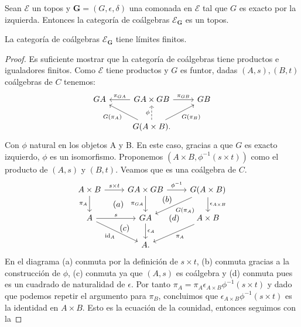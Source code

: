 \begin{theorem}[label=thm:toposcoalg]
  Sean $\mathcal{E}$ un topos y $\textbf{G}=(G,\epsilon,\delta)$ una comonada en $\mathcal{E}$ tal que
  $G$ es exacto por la izquierda. Entonces la categoría de coálgebras $\mathcal{E}_\textbf{G}$ es un topos.
\end{theorem}
\begin{lemma}
  La categoría de coálgebras $\mathcal{E}_\textbf{G}$ tiene límites finitos.
\end{lemma}
\begin{proof}
  Es suficiente mostrar que la categoría de coálgebras tiene productos e igualadores finitos. 
  Como $\mathcal{E}$ tiene productos y $G$ es funtor, dadas $(A,s),(B,t)$ coálgebras de $C$ tenemos:
  \begin{equation*}
    \begin{tikzcd}
        GA & GA\times GB \ar[swap]{l}{\pi_{GA}} \ar{r}{\pi_{GB}} & GB\\
        & G(A\times B). \ar{ul}{G(\pi_A)} \ar[dashed]{u}{\phi} \ar[swap]{ur}{G(\pi_B)}
    \end{tikzcd}
  \end{equation*}
  Con $\phi$ natural en los objetos A y B. En este caso, gracias a que $G$ es
  exacto izquierdo, $\phi$ es un isomorfismo. Proponemos
  $(A\times B, \phi^{-1}(s\times t))$ como el producto de $(A,s)$ y $(B,t)$. Veamos que
  es una coálgebra de $C$.
  \begin{equation*}
    \begin{tikzcd}
        A\times B\ar{r}{s\times t}\ar[swap]{d}{\pi_A}\ar[phantom]{2-2}{(a)} & GA\times GB \ar[swap]{d}{\pi_{GA}}\ar{r}{\phi^{-1}}\ar[phantom]{2-3}[near start]{(b)} 
          & G(A\times B)\ar{dl}{G(\pi_A)}\ar{d}{\epsilon_{A\times B}} \\
        A\ar{r}{s}\ar[swap]{dr}{\id_A} & GA\ar{d}{\epsilon_A}\ar[phantom]{r}{(d)}\ar[phantom]{3-1}[near start]{(c)} & A\times B \ar{dl}{\pi_A} \\
        {} & A.
    \end{tikzcd}
  \end{equation*}
  En el diagrama (a) conmuta por la definición de $s\times t$, (b) conmuta gracias a la construcción
  de $\phi$, (c) conmuta ya que $(A,s)$ es coálgebra y (d) conmuta pues es un cuadrado de naturalidad
  de $\epsilon$. Por tanto $\pi_A=\pi_A \epsilon_{A\times B} \phi^{-1}(s\times t)$ y dado que podemos
  repetir el argumento para $\pi_B$, concluimos que $\epsilon_{A\times B} \phi^{-1}(s\times t)$
  es la identidad en $A\times B$. Esto es la ecuación de la counidad, entonces seguimos con la

\end{proof}
